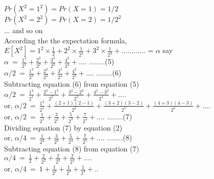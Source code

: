 \documentclass{book}
\begin{document}
$Pr(X^2=1^2) = Pr(X=1) = 1/2$\\

$Pr(X^2=2^2) = Pr(X=2) = 1/2^2$\\

... and so on \\

According the the expectation formula, $E[X^2] = 1^2 \times \frac{1}{2} + 2^2 \times \frac{1}{2^2} + 3^2 \times \frac{1}{2^3} + ............  $ = $\alpha$ say\\

$\alpha\ =\ \frac{1^2}{2^1} + \frac{2^2}{2^2} + \frac{3^2}{2^3} + \frac{4^2}{2^4} + .... $   \hspace{5mm} ........(5) \\	


$\alpha/2\ =\ \frac{1^2}{2^2} + \frac{2^2}{2^3} + \frac{3^2}{2^4} + \frac{4^2}{2^5} + .... $   \hspace{5mm} ........(6)  \\

Subtracting equation (6) from equation (5)\\

$\alpha/2\ =\ \frac{1^2}{2^1} + \frac{2^2-1^2}{2^2} + \frac{3^2-2^2}{2^3} + \frac{4^2-3^2}{2^4} + .... $    \\


or, $\alpha/2\ =\ \frac{1^2}{2^1} + \frac{(2+1)(2-1)}{2^2} + \frac{(3+2)(3-2)}{2^3} + \frac{(4+3)(4-3)}{2^4} + .... $    \\


or, $\alpha/2\ =\ \frac{1}{2^1} + \frac{3}{2^2} + \frac{5}{2^3} + \frac{7}{2^4} + .... $     \hspace{5mm} ........(7)\\	

Dividing equation (7) by equation (2)\\

 or, $\alpha/4\ =\ \frac{1}{2^2} + \frac{3}{2^3} + \frac{5}{2^4} + \frac{7}{2^5} + .... $  \hspace{5mm} ........(8)\\
 
 Subtracting equation (8) from equation (7)\\
 
$\alpha/4\ =\ \frac{1}{2} + \frac{2}{2^2} + \frac{2}{2^3} + \frac{2}{2^4} + .... $\\

or, $\alpha/4\ =\ 1 + \frac{1}{2^2} + \frac{1}{2^3} + \frac{1}{2^4} + .. $\\ 
\end{document}
